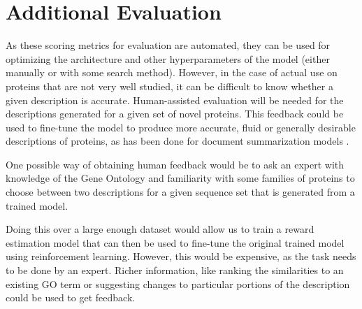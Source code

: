 \documentclass{specification}
\begin{document}

%
%



\section*{Additional Evaluation}
As these scoring metrics for evaluation are automated, they can be used for optimizing the architecture and other hyperparameters of the model (either manually or with some search method). However, in the case of actual use on proteins that are not very well studied, it can be difficult to know whether a given description is accurate. Human-assisted evaluation will be needed for the descriptions generated for a given set of novel proteins. This feedback could be used to fine-tune the model to produce more accurate, fluid or generally desirable descriptions of proteins, as has been done for document summarization models \cite{finetuningWithHuman, learningToSummarize}.

One possible way of obtaining human feedback would be to ask an expert with knowledge of the Gene Ontology and familiarity with some families of proteins to choose between two descriptions for a given sequence set that is generated from a trained model.

Doing this over a large enough dataset would allow us to train a reward estimation model that can then be used to fine-tune the original trained model using reinforcement learning. However, this would be expensive, as the task needs to be done by an expert. Richer information, like ranking the similarities to an existing GO term or suggesting changes to particular portions of the description could be used to get feedback.

\printbibliography
\end{document}
